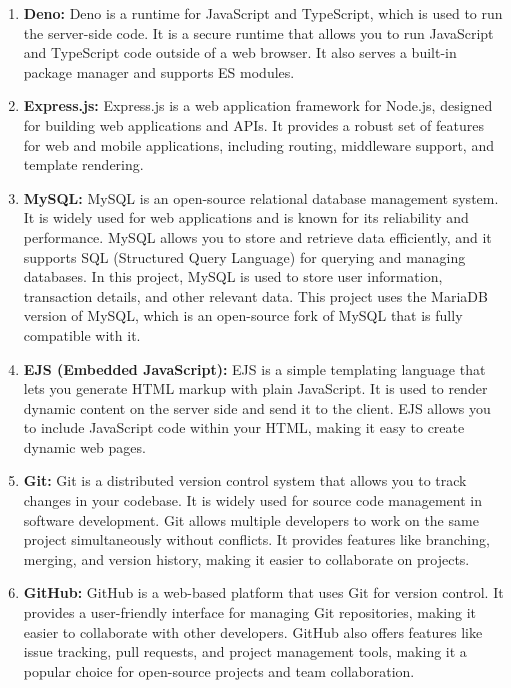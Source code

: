 \begin{enumerate}
    \item \textbf{Deno:}
    Deno is a runtime for JavaScript and TypeScript, which is used to run the
    server-side code. It is a secure runtime that allows you to run JavaScript
    and TypeScript code outside of a web browser. It also serves a built-in
    package manager and supports ES modules.

    \item \textbf{Express.js:}
    Express.js is a web application framework for Node.js, designed for
    building web applications and APIs. It provides a robust set of features
    for web and mobile applications, including routing, middleware support, and
    template rendering.

    \item \textbf{MySQL:}
    MySQL is an open-source relational database management system. It is widely
    used for web applications and is known for its reliability and performance.
    MySQL allows you to store and retrieve data efficiently, and it supports
    SQL (Structured Query Language) for querying and managing databases. In
    this project, MySQL is used to store user information, transaction details,
    and other relevant data. This project uses the MariaDB version of MySQL,
    which is an open-source fork of MySQL that is fully compatible with it.

    \item \textbf{EJS (Embedded JavaScript):}
    EJS is a simple templating language that lets you generate HTML markup with
    plain JavaScript. It is used to render dynamic content on the server side
    and send it to the client. EJS allows you to include JavaScript code within
    your HTML, making it easy to create dynamic web pages.

    \item \textbf{Git:}
    Git is a distributed version control system that allows you to track
    changes in your codebase. It is widely used for source code management in
    software development. Git allows multiple developers to work on the same
    project simultaneously without conflicts. It provides features like
    branching, merging, and version history, making it easier to collaborate on
    projects.

    \item \textbf{GitHub:}
    GitHub is a web-based platform that uses Git for version control. It
    provides a user-friendly interface for managing Git repositories, making it
    easier to collaborate with other developers. GitHub also offers features
    like issue tracking, pull requests, and project management tools, making it
    a popular choice for open-source projects and team collaboration.


\end{enumerate}
